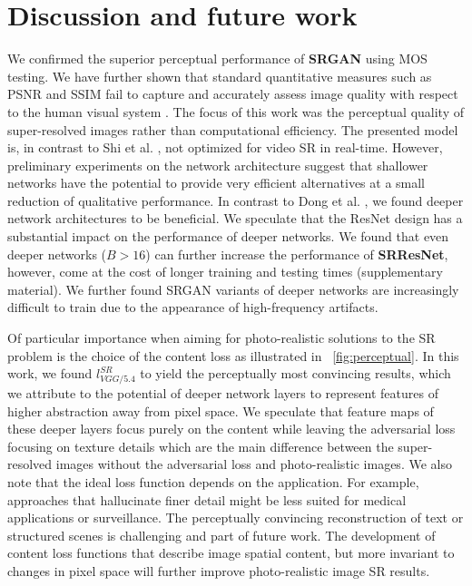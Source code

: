 \documentclass[10pt,twocolumn,letterpaper]{article}
\begin{document}
\section{Discussion and future work}
\label{sec:discussion}
We confirmed the superior perceptual performance of \textbf{SRGAN} using \ac{MOS} testing. We have further shown that standard quantitative measures such as PSNR and SSIM fail to capture and accurately assess image quality with respect to the human visual system \cite{Toderici2016}.
The focus of this work was the perceptual quality of super-resolved images rather than computational efficiency. The presented model is, in contrast to Shi et al. \cite{Shi2016ESPCN}, not optimized for video \ac{SR} in real-time. However, preliminary experiments on the network architecture suggest that shallower networks have the potential to provide very efficient alternatives at a small reduction of qualitative performance. %
In contrast to Dong et al. \cite{dong2016image}, we found deeper network architectures to be beneficial. We speculate that the \ac{ResNet} design has a substantial impact on the performance of deeper networks. We found that even deeper networks ($B>16$) can further increase the performance of \textbf{SRResNet}, however, come at the cost of longer training and testing times (\cf supplementary material). We further found \ac{SRGAN} variants of deeper networks are increasingly difficult to train due to the appearance of high-frequency artifacts.

Of particular importance when aiming for photo-realistic solutions to the \ac{SR} problem is the choice of the content loss as illustrated in \figurename~\ref{fig:perceptual}. In this work, we found $l^{SR}_{VGG/5.4}$ to yield the perceptually most convincing results, which we attribute to the potential of deeper network layers to represent features of higher abstraction \cite{zeiler2014visualizing,Yosinski2015,Mahendran2016} away from pixel space. We speculate that feature maps of these deeper layers focus purely on the content while leaving the adversarial loss focusing on texture details which are the main difference between the super-resolved images without the adversarial loss and photo-realistic images.
We also note that the ideal loss function depends on the application. For example, approaches that hallucinate finer detail might be less suited for medical applications or surveillance. The perceptually convincing reconstruction of text or structured scenes \cite{Huang15selfexemplars} is challenging and part of future work.
The development of content loss functions that describe image spatial content, but more invariant to changes in pixel space will further improve photo-realistic image \ac{SR} results.
%
\end{document}
